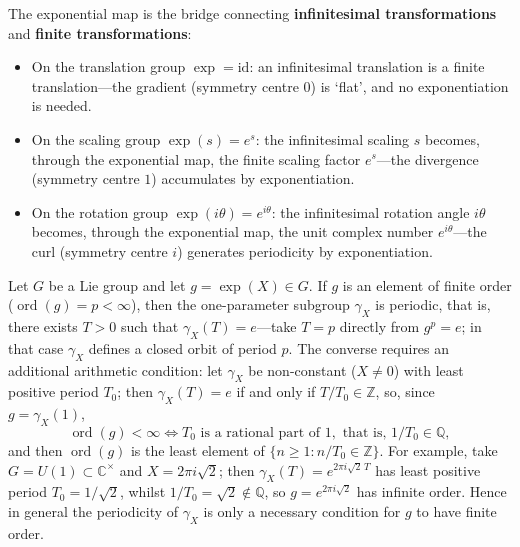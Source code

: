 \begin{remark}\label{rem:exponential_grammar}
The exponential map is the bridge connecting \textbf{infinitesimal transformations} and \textbf{finite transformations}:
\begin{itemize}
    \item On the translation group $\exp = \text{id}$: an infinitesimal translation is a finite translation---the gradient (symmetry centre $0$) is `flat', and no exponentiation is needed.
    \item On the scaling group $\exp(s) = e^s$: the infinitesimal scaling $s$ becomes, through the exponential map, the finite scaling factor $e^s$---the divergence (symmetry centre $1$) accumulates by exponentiation.
    \item On the rotation group $\exp(i\theta) = e^{i\theta}$: the infinitesimal rotation angle $i\theta$ becomes, through the exponential map, the unit complex number $e^{i\theta}$---the curl (symmetry centre $i$) generates periodicity by exponentiation.
\end{itemize}
\end{remark}

\begin{proposition}\label{prop:lie_group_finite_order}
Let $G$ be a Lie group and let $g = \exp(X) \in G$. If $g$ is an element of finite order ($\operatorname{ord}(g) = p < \infty$), then the one-parameter subgroup $\gamma_X$ is periodic, that is, there exists $T > 0$ such that $\gamma_X(T) = e$---take $T=p$ directly from $g^p=e$; in that case $\gamma_X$ defines a closed orbit of period $p$. The converse requires an additional arithmetic condition: let $\gamma_X$ be non-constant ($X\ne0$) with least positive period $T_0$; then $\gamma_X(T)=e$ if and only if $T/T_0\in\mathbb{Z}$, so, since $g=\gamma_X(1)$,
\[
\operatorname{ord}(g)<\infty \iff T_0 \text{ is a rational part of } 1,\text{ that is, } 1/T_0\in\mathbb{Q},
\]
and then $\operatorname{ord}(g)$ is the least element of $\{n\ge1: n/T_0\in\mathbb{Z}\}$. For example, take $G=U(1)\subset\mathbb{C}^\times$ and $X=2\pi i\sqrt2$; then $\gamma_X(T)=e^{2\pi i\sqrt2\,T}$ has least positive period $T_0=1/\sqrt2$, whilst $1/T_0=\sqrt2\notin\mathbb{Q}$, so $g=e^{2\pi i\sqrt2}$ has infinite order. Hence in general the periodicity of $\gamma_X$ is only a necessary condition for $g$ to have finite order.
\end{proposition}

